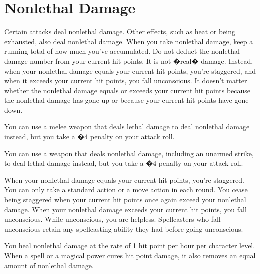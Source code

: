 \section{Nonlethal Damage}

Certain attacks deal nonlethal damage. Other effects, such as heat or being exhausted, also deal nonlethal damage. When you take nonlethal damage, keep a running total of how much you've accumulated. Do not deduct the nonlethal damage number from your current hit points. It is not �real� damage. Instead, when your nonlethal damage equals your current hit points, you're staggered, and when it exceeds your current hit points, you fall unconscious. It doesn't matter whether the nonlethal damage equals or exceeds your current hit points because the nonlethal damage has gone up or because your current hit points have gone down.

You can use a melee weapon that deals lethal damage to deal nonlethal damage instead, but you take a �4 penalty on your attack roll.

You can use a weapon that deals nonlethal damage, including an unarmed strike, to deal lethal damage instead, but you take a �4 penalty on your attack roll.

When your nonlethal damage equals your current hit points, you're staggered. You can only take a standard action or a move action in each round. You cease being staggered when your current hit points once again exceed your nonlethal damage. When your nonlethal damage exceeds your current hit points, you fall unconscious. While unconscious, you are helpless.
Spellcasters who fall unconscious retain any spellcasting ability they had before going unconscious.

You heal nonlethal damage at the rate of 1 hit point per hour per character level. When a spell or a magical power cures hit point damage, it also removes an equal amount of nonlethal damage.

